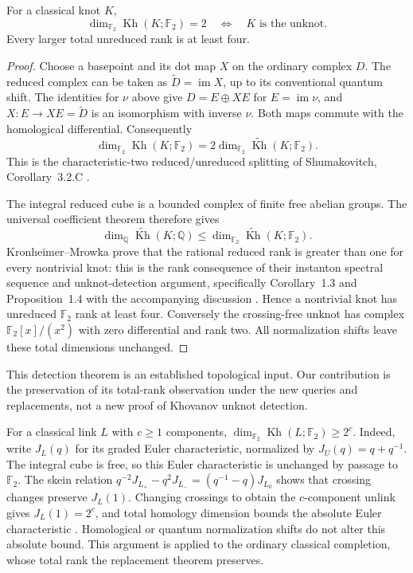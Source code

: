 \begin{proposition}
\label{prop:first-jet-rank-two}
For a classical knot $K$,
\[
 \dim_{\mathbb F_2}\operatorname{Kh}(K;\mathbb F_2)=2
 \quad\Longleftrightarrow\quad K\text{ is the unknot}.
\]
Every larger total unreduced rank is at least four.
\end{proposition}

\begin{proof}
Choose a basepoint and its dot map $X$ on the ordinary complex $D$.
The reduced complex can be taken as $\widetilde D=\operatorname{im}X$,
up to its conventional quantum shift. The identities for $\nu$ above give
$D=E\oplus XE$ for $E=\operatorname{im}\nu$, and
$X:E\to XE=\widetilde D$ is an isomorphism with inverse $\nu$.
Both maps commute with the homological differential. Consequently
\[
 \dim_{\mathbb F_2}\operatorname{Kh}(K;\mathbb F_2)
 =2\dim_{\mathbb F_2}\widetilde{\operatorname{Kh}}(K;\mathbb F_2).
\]
This is the characteristic-two reduced/unreduced splitting of
Shumakovitch, Corollary~3.2.C \cite{Shumakovitch2014}.

The integral reduced cube is a bounded complex of finite free abelian
groups. The universal coefficient theorem therefore gives
\[
 \dim_{\mathbb Q}\widetilde{\operatorname{Kh}}(K;\mathbb Q)
 \le
 \dim_{\mathbb F_2}\widetilde{\operatorname{Kh}}(K;\mathbb F_2).
\]
Kronheimer--Mrowka prove that the rational reduced rank is greater
than one for every nontrivial knot: this is the rank consequence of
their instanton spectral sequence and unknot-detection argument,
specifically Corollary~1.3 and Proposition~1.4 with the accompanying
discussion \cite{KM2011Kh}. Hence a nontrivial knot has unreduced
$\mathbb F_2$ rank at least four. Conversely the crossing-free unknot
has complex $\mathbb F_2[x]/(x^2)$ with zero differential and rank two.
All normalization shifts leave these total dimensions unchanged.
\end{proof}

This detection theorem is an established topological input.
Our contribution is the preservation of its total-rank observation
under the new queries and replacements, not a new proof of Khovanov
unknot detection.


For a classical link $L$ with $c\ge1$ components,
$\dim_{\mathbb F_2}\operatorname{Kh}(L;\mathbb F_2)\ge2^c$.
Indeed, write $J_L(q)$ for its graded Euler characteristic, normalized
by $J_U(q)=q+q^{-1}$. The integral cube is free, so this Euler
characteristic is unchanged by passage to $\mathbb F_2$.
The skein relation
$q^{-2}J_{L_+}-q^2J_{L_-}=(q^{-1}-q)J_{L_0}$
shows that crossing changes preserve $J_L(1)$.
Changing crossings to obtain the $c$-component unlink gives
$J_L(1)=2^c$, and total homology dimension bounds the absolute
Euler characteristic \cite{Khovanov2000}.
Homological or quantum normalization shifts do not alter this
absolute bound. This argument is applied to the ordinary classical
completion, whose total rank the replacement theorem preserves.

